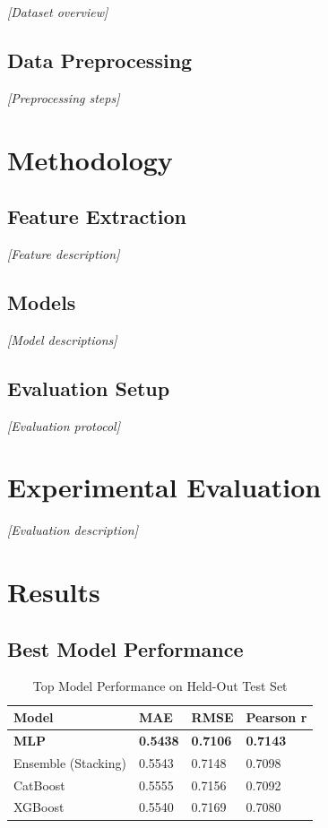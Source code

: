\documentclass[a4paper,oneside,bibliography=totoc]{scrbook}
\begin{document}
\textit{[Dataset overview]}

\section{Data Preprocessing}

\textit{[Preprocessing steps]}

\chapter{Methodology}
\label{ch:methodology}

\section{Feature Extraction}

\textit{[Feature description]}

\section{Models}

\textit{[Model descriptions]}

\section{Evaluation Setup}

\textit{[Evaluation protocol]}

\chapter{Experimental Evaluation}
\label{ch:evaluation}

\textit{[Evaluation description]}

\chapter{Results}
\label{ch:results}

\section{Best Model Performance}

\begin{table}[tb]
  \centering
  \small
  \begin{tabularx}{\textwidth}{lXXX}
    \toprule
    \textbf{Model} & \textbf{MAE} & \textbf{RMSE} & \textbf{Pearson r} \\
    \midrule
    \textbf{MLP} & \textbf{0.5438} & \textbf{0.7106} & \textbf{0.7143} \\
    Ensemble (Stacking) & 0.5543 & 0.7148 & 0.7098 \\
    CatBoost & 0.5555 & 0.7156 & 0.7092 \\
    XGBoost & 0.5540 & 0.7169 & 0.7080 \\
    \bottomrule
  \end{tabularx}
  \caption{Top Model Performance on Held-Out Test Set}
  \label{tab:best_models}
\end{table}
\end{document}
